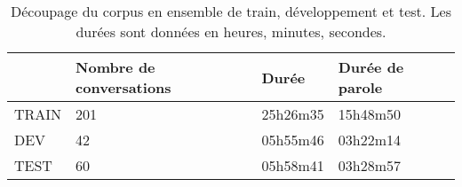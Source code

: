 \begin{table}[]
\begin{tabular}{|l|l|l|l|}
\hline
      & Nombre de conversations & Durée    & Durée de parole \\ \hline
TRAIN & 201                     & 25h26m35 & 15h48m50        \\ \hline
DEV   & 42                      & 05h55m46 & 03h22m14        \\ \hline
TEST  & 60                      & 05h58m41 & 03h28m57        \\ \hline
\end{tabular}
\caption{Découpage du corpus en ensemble de train, développement et test. Les durées sont données en heures, minutes, secondes.}
\label{tab:repartitionEnSets}
\end{table}
